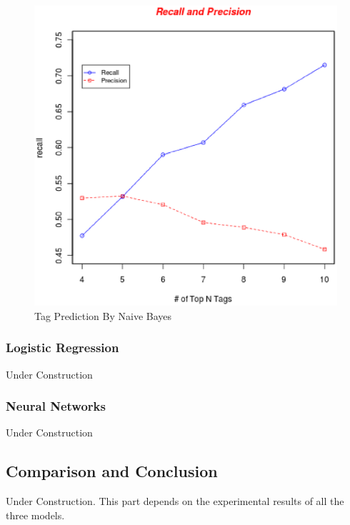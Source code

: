 \begin{figure}[htb!]
\centering%
    \includegraphics[scale=0.42]{naives.eps}
\caption{Tag Prediction By Naive Bayes}
\label{fig:naive}
\end{figure}

\subsubsection{Logistic Regression}
Under Construction

\subsubsection{Neural Networks}
Under Construction

\subsection{Comparison and Conclusion}
Under Construction. This part depends on the experimental results of all the three models.
